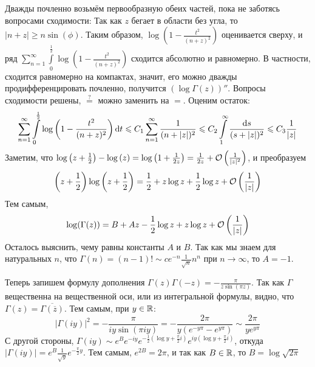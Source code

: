 \documentclass[a4paper]{report}
\begin{document}
{{    Дважды почленно возьмём первообразную обеих частей, пока не заботясь вопросами сходимости:
    Так как $z$ бегает в области без угла, то $|n + z| \ge n\sin(\phi)$.
        Таким образом, $\log\left(1 - \frac{t^2}{(n + z)^2}\right)$ оценивается сверху, и ряд $\sum\limits_{n = 1}^{\infty}\int\limits_{0}^{\frac{1}{2}}\log\left(1 - \frac{t^2}{(n + z)^2}\right)$ сходится абсолютно и равномерно.
        В частности, сходится равномерно на компактах, значит, его можно дважды продифференцировать почленно, получится $(\log \Gamma (z))''$.
        Вопросы сходимости решены, $\overset{?}=$ можно заменить на $=$.
    Оценим остаток:
    \[\sum\limits_{n = 1}^{\infty}\int\limits_{0}^{\frac{1}{2}}\log\left(1 - \frac{t^2}{(n + z)^2}\right)\operatorname{d}\! t \leqslant C_1 \sum\limits_{n = 1}^{\infty}\frac{1}{(n + |z|)^2} \leqslant C_2 \int\limits_1^\infty \frac{\operatorname{d}\! s}{(s + |z|)^2} \leqslant C_3\frac{1}{|z|}\]
        Заметим, что $\log\left(z + \frac{1}{2}\right) - \log\left(z\right) = \log\left(1 + \frac{1}{2z}\right) = \frac{1}{2z}+ \mathcal{O}\left(\frac{1}{|z|^2}\right)$, и преобразуем
    \[\left(z + \frac{1}{2}\right)\log\left(z + \frac{1}{2}\right) = \frac{1}{2} + z \log z + \frac{1}{2}\log z + \mathcal{O}\left(\frac{1}{|z|}\right)\]
    Тем самым,
    \[\log(\Gamma(z)) = B + Az - \frac{1}{2}\log z + z \log z + \mathcal{O}\left(\frac{1}{|z|}\right)\]
    Осталось выяснить, чему равны константы $A$ и $B$.
    Так как мы знаем для натуральных $n$, что $\Gamma(n) = (n - 1)! \sim c e^{-n}\frac{1}{\sqrt{n}}n^n$ при $n \to \infty$, то $A = -1$.

    Теперь запишем формулу дополнения $\Gamma(z) \Gamma(-z) = -\frac{\pi}{z \sin \left(\pi z\right)}$.
        Так как $\Gamma$ вещественна на вещественной оси, или из интегральной формулы, видно, что $\Gamma(z) = \overline{\Gamma\left(\overline{z}\right)}$.
        Тем самым, при $y \in \mathbb{R}$:
    \[|\Gamma(iy)|^2 = -\frac{\pi}{i y \sin\left(\pi i y\right)} = -\frac{2\pi }{y\left(e^{-y \pi} - e^{y\pi}\right)} \sim \frac{2\pi}{y e^{y\pi}}\]
    С другой стороны, $\Gamma(iy) \sim e^{B}e^{-iy}e^{-\frac{1}{2}\left(\log y + \frac{\pi}{2}i\right)}e^{iy\left(\log y + \frac{\pi}{2}i\right)}$, откуда $|\Gamma(iy)| = e^B \frac{1}{\sqrt{y}}e^{-\frac{\pi}{2}y}$.
        Тем самым, $e^{2B} = 2\pi$, и так как $B \in \mathbb{R}$, то $B = \log\sqrt{2\pi}$
    }
    }
\end{document}
